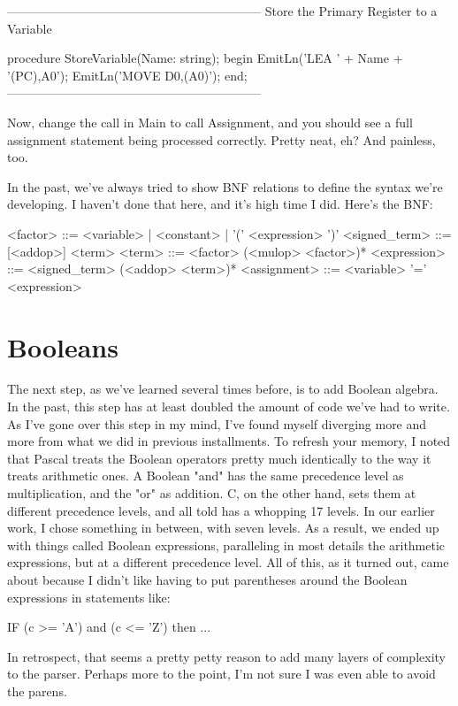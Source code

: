 \documentclass[float=false, crop=false]{standalone}
\begin{document}
\begin{code}
{--------------------------------------------------------------}
{ Store the Primary Register to a Variable }

procedure StoreVariable(Name: string);
begin
	EmitLn('LEA ' + Name + '(PC),A0');
	EmitLn('MOVE D0,(A0)');
end;
{--------------------------------------------------------------}
\end{code}

Now, change the call in Main to call Assignment, and you should see a full
assignment statement being processed correctly. Pretty neat, eh? And painless,
too.

In the past, we've always tried to show BNF relations to define the syntax we're
developing. I haven't done that here, and it's high time I did. Here's the BNF:


<factor>      ::= <variable> | <constant> | '(' <expression> ')'
<signed_term> ::= [<addop>] <term>
<term>        ::= <factor> (<mulop> <factor>)*
<expression>  ::= <signed_term> (<addop> <term>)*
<assignment>  ::= <variable> '=' <expression>

\section{Booleans}

The next step, as we've learned several times before, is to add Boolean algebra.
In the past, this step has at least doubled the amount of code we've had to
write. As I've gone over this step in my mind, I've found myself diverging more
and more from what we did in previous installments. To refresh your memory, I
noted that Pascal treats the Boolean operators pretty much identically to the
way it treats arithmetic ones. A Boolean "and" has the same precedence level as
multiplication, and the "or" as addition. C, on the other hand, sets them at
different precedence levels, and all told has a whopping 17 levels. In our
earlier work, I chose something in between, with seven levels. As a result, we
ended up with things called Boolean expressions, paralleling in most details the
arithmetic expressions, but at a different precedence level. All of this, as it
turned out, came about because I didn't like having to put parentheses around
the Boolean expressions in statements like:

	     IF (c >= 'A') and (c <= 'Z') then ...

In retrospect, that seems a pretty petty reason to add many layers of complexity
to the parser. Perhaps more to the point, I'm not sure I was even able to avoid
the parens.
\end{document}

